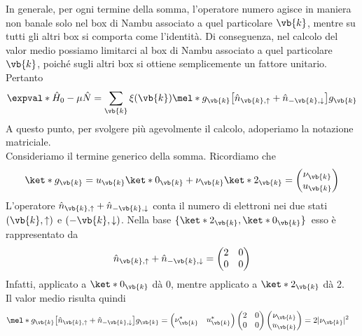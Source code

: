 In generale, per ogni termine della somma, l'operatore numero agisce in maniera non banale solo nel box di Nambu associato a quel particolare $\vb{k}$, mentre su tutti gli altri box si comporta come l'identità. Di conseguenza, nel calcolo del valor medio possiamo limitarci al box di Nambu associato a quel particolare $\vb{k}$, poiché sugli altri box si ottiene semplicemente un fattore unitario. Pertanto
\begin{equation*}
   \expval*{\hat{H}_0 - \mu \hat{N}}
   =\sum_{\vb{k}} \xi(\vb{k}) \mel*{g_{\vb{k}}}{\bigl[ \hat{n}_{\vb{k},\uparrow} + \hat{n}_{-\vb{k},\downarrow} \bigr]}{g_{\vb{k}}}
\end{equation*}
A questo punto, per svolgere più agevolmente il calcolo, adoperiamo la notazione matriciale.\\
Consideriamo il termine generico della somma. Ricordiamo che
\begin{equation*}
   \ket*{g_{\vb{k}}}
   =u_{\vb{k}} \ket*{0_{\vb{k}}} + \nu_{\vb{k}} \ket*{2_{\vb{k}}}
   =
   \begin{pmatrix}
      \nu_{\vb{k}}\\
      u_{\vb{k}}
   \end{pmatrix}
\end{equation*}
L'operatore $\hat{n}_{\vb{k},\uparrow} + \hat{n}_{-\vb{k},\downarrow}$ conta il numero di elettroni nei due stati $(\vb{k},\uparrow)$ e $(-\vb{k},\downarrow)$. Nella base $\{\ket*{2_{\vb{k}}}, \ket*{0_{\vb{k}}}\}$\, esso è rappresentato da
\begin{equation*}
   \hat{n}_{\vb{k},\uparrow} + \hat{n}_{-\vb{k},\downarrow}
   =\begin{pmatrix}
      2 & 0 \\
      0 & 0
   \end{pmatrix}
\end{equation*}
Infatti, applicato a $\ket*{0_{\vb{k}}}$ dà 0, mentre applicato a $\ket*{2_{\vb{k}}}$ dà 2.\\
Il valor medio risulta quindi
\begin{equation*}
   \begin{split}
      \mel*{g_{\vb{k}}}
      {\bigl[ \hat{n}_{\vb{k},\uparrow} + \hat{n}_{-\vb{k},\downarrow} \bigr]}
      {g_{\vb{k}}}
      & =
      \begin{pmatrix}
         \nu^*_{\vb{k}} & u^*_{\vb{k}}
      \end{pmatrix}
      \begin{pmatrix}
         2 & 0 \\
         0 & 0
      \end{pmatrix}
      \begin{pmatrix}
         \nu_{\vb{k}} \\
         u_{\vb{k}}
      \end{pmatrix}
      = 2 |\nu_{\vb{k}}|^2
   \end{split}
\end{equation*}
